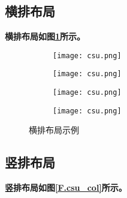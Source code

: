\subsection{横排布局}

\textbf{横排布局如图\ref{F.csu_row}所示。}

\begin{figure}[!htb]
    \centering
    \begin{subfigure}[t]{0.24\linewidth}
    	\captionsetup{justification=centering} %
        \begin{minipage}[b]{1\linewidth}
        \texttt{[image: csu.png]}
         \caption{}
        \end{minipage}
    \end{subfigure}
    \begin{subfigure}[t]{0.24\linewidth}
    \captionsetup{justification=centering} %
        \begin{minipage}[b]{1\linewidth}
        \texttt{[image: csu.png]}
        \caption{}
        \end{minipage}
    \end{subfigure}
    \begin{subfigure}[t]{0.24\linewidth}
    	\captionsetup{justification=centering} %
        \begin{minipage}[b]{1\linewidth}
        \texttt{[image: csu.png]}
        \caption{}
        \end{minipage}
    \end{subfigure}
    \begin{subfigure}[t]{0.24\linewidth}
    	\captionsetup{justification=centering} %
        \begin{minipage}[b]{1\linewidth}
        \texttt{[image: csu.png]}
        \caption{}
        \end{minipage}
    \end{subfigure}
    \caption{横排布局示例}
    \label{F.csu_row}
\end{figure}



\subsection{竖排布局}
\textbf{竖排布局如图\ref{F.csu_col}所示。}

